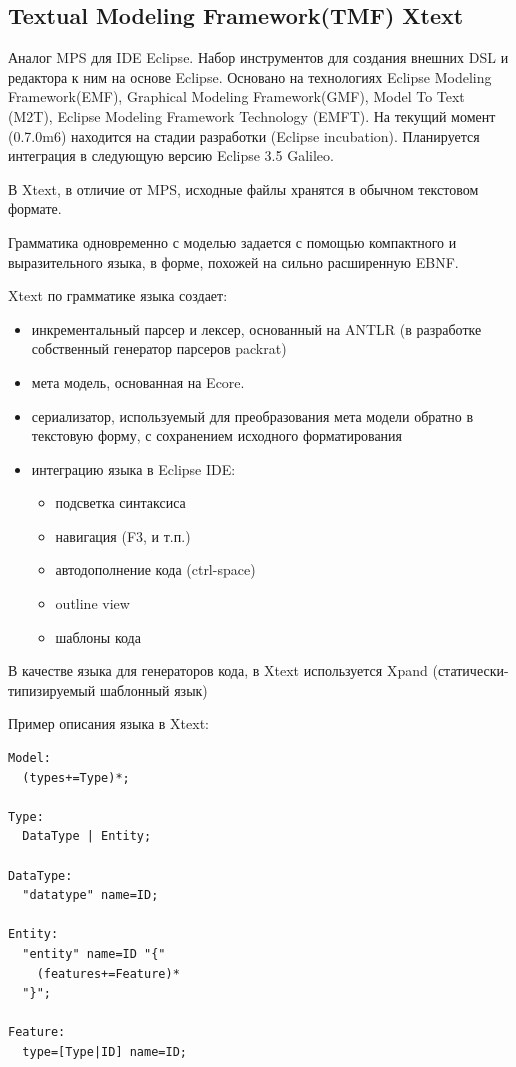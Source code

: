 \documentclass[a4paper,12pt]{article}
\begin{document}
\subsection{Textual Modeling Framework(TMF) Xtext}
Аналог MPS для IDE Eclipse.
Набор инструментов для создания внешних DSL и редактора к ним на основе Eclipse.
Основано на технологиях Eclipse Modeling Framework(EMF), Graphical Modeling
Framework(GMF), Model To Text (M2T), Eclipse Modeling Framework Technology
(EMFT). На текущий момент (0.7.0m6) находится на стадии разработки (Eclipse
incubation). Планируется интеграция в следующую версию Eclipse 3.5
Galileo.

В Xtext, в отличие от MPS, исходные файлы хранятся в обычном текстовом формате.

Грамматика одновременно с моделью задается с помощью компактного и
выразительного языка, в форме, похожей на сильно расширенную EBNF.

Xtext по грамматике языка создает:
\begin{itemize}
  \item инкрементальный парсер и лексер, основанный на ANTLR (в разработке
  собственный генератор парсеров packrat)
  \item мета модель, основанная на Ecore.
  \item сериализатор, используемый для преобразования мета модели обратно в
  текстовую форму, с сохранением исходного форматирования 
  \item интеграцию языка в Eclipse IDE:
  \begin{itemize}
    \item подсветка синтаксиса
    \item навигация (F3, и т.п.)
    \item автодополнение кода (ctrl-space)
    \item outline view
    \item шаблоны кода
  \end{itemize}
\end{itemize}

В качестве языка для генераторов кода, в Xtext используется Xpand
(статически-типизируемый шаблонный язык)

\begin{example}
Пример описания языка в Xtext:
\end{example}
\begin{verbatim}
Model:
  (types+=Type)*;

Type:
  DataType | Entity;

DataType:
  "datatype" name=ID;

Entity:
  "entity" name=ID "{"
    (features+=Feature)* 
  "}";

Feature:
  type=[Type|ID] name=ID;   
\end{verbatim}
\end{document}
